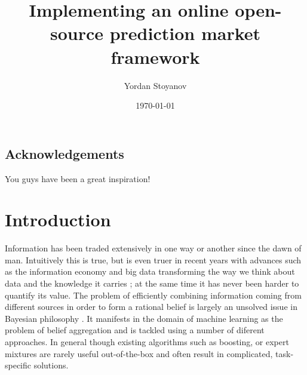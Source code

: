 \documentclass[bsc,frontabs,twoside,singlespacing,parskip,deptreport]{infthesis}     %
\begin{document}
\title{Implementing an online open-source prediction market framework}

\author{Yordan Stoyanov}



\date{\today}


\maketitle

\section*{Acknowledgements}
You guys have been a great inspiration!

\tableofcontents



\chapter{Introduction}

	Information has been traded extensively in one way or another since the dawn of man. Intuitively this is true, but is even truer in recent years with advances such as the information economy and big data transforming the way we think about data and the knowledge it carries \cite{mcgee_managing_1993}; at the same time it has never been harder to quantify its value. The problem of efficiently combining information coming from different sources in order to form a rational belief is largely an unsolved issue in Bayesian philosophy \cite{greene_collective_2010}. It manifests in the domain of machine learning as the problem of belief aggregation and is tackled using a number of diferent approaches. In general though existing algorithms such as boosting, or expert mixtures are rarely useful out-of-the-box and often result in complicated, task-specific solutions. 
\end{document}
